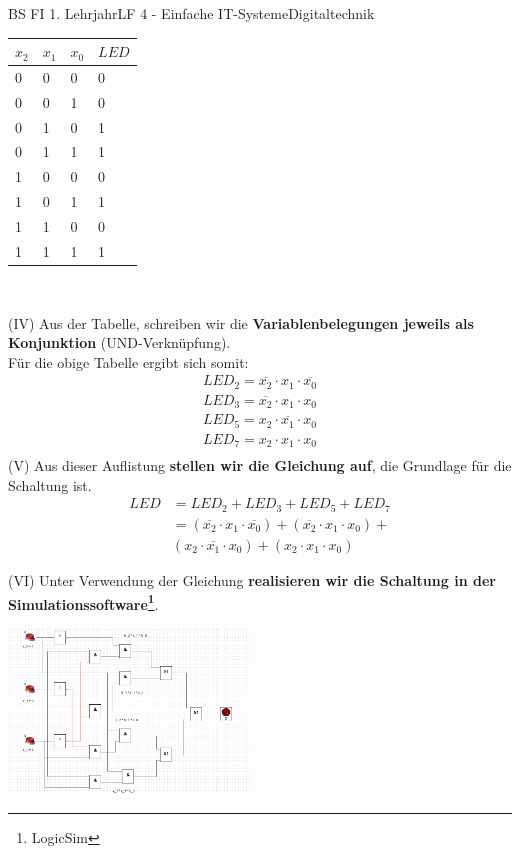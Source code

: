 \documentclass[11pt,twocolumn,oneside,openany,headings=optiontotoc,11pt,numbers=noenddot]{article}
\begin{document}
\begin{worksheet}{BS FI 1. Lehrjahr}{LF 4 - Einfache IT-Systeme}{Digitaltechnik}
		\begin{tabularx}{0.48\textwidth}{|M|M|M|M|}
			\hline
			 \(x_2\) & \(x_1\) & \(x_0\) & \(LED\) \\
			 & 0 & 0 & 0\\
			 & 0 & 1 & 0\\
			\hline
			 0 & 1 & 0 & 1\\
			\hline
			 0 & 1 & 1 & 1\\
			 & 0 & 0 & 0\\
			\hline
			 1 & 0 & 1 & 1\\
			 & 1 & 0 & 0\\
			\hline
			 1 & 1 & 1 & 1\\
			\hline
		\end{tabularx}\\
		\par
		(IV) Aus der Tabelle, schreiben wir die \textbf{Variablenbelegungen jeweils als Konjunktion} (UND-Verknüpfung).\\
		Für die obige Tabelle ergibt sich somit:
		\begin{align*}
			LED_2 = \overline{x_2} \cdot{} x_1 \cdot{} \overline{x_0}\\
			LED_3 = \overline{x_2} \cdot{} x_1 \cdot{} x_0\\
			LED_5 = x_2 \cdot{} \overline{x_1} \cdot{} x_0\\
			LED_7 = x_2 \cdot{} x_1 \cdot{} x_0\\
		\end{align*}
		\indent
		(V) Aus dieser Auflistung \textbf{stellen wir die Gleichung auf}, die Grundlage für die Schaltung ist.
		\begin{align*}
			LED & = LED_2 + LED_3 + LED_5 + LED_7\\
			& = (\overline{x_2} \cdot{} x_1 \cdot{} \overline{x_0}) + (\overline{x_2} \cdot{} x_1 \cdot{} x_0) +\\
			& (x_2 \cdot{} \overline{x_1} \cdot{} x_0) + (x_2 \cdot{} x_1 \cdot{} x_0)
		\end{align*}
		\par
		(VI) Unter Verwendung der Gleichung \textbf{realisieren wir die Schaltung in der Simulationssoftware\footnote{LogicSim}}.\\
		\par\noindent
		\includegraphics[width=0.48\textwidth]{../99_Bilder/prim.jpg}\\

\end{worksheet}
\end{document}
